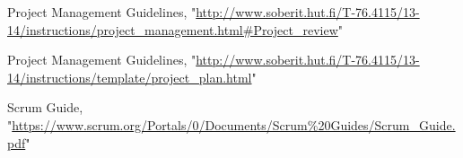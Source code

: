 \documentclass{report}
\begin{document}
 
\begin{thebibliography}{9}

	Project Management Guidelines, "\url{http://www.soberit.hut.fi/T-76.4115/13-14/instructions/project_management.html#Project_review}"
	
		Project Management Guidelines, "\url{http://www.soberit.hut.fi/T-76.4115/13-14/instructions/template/project_plan.html}"

Scrum Guide, "\url{https://www.scrum.org/Portals/0/Documents/Scrum%20Guides/Scrum_Guide.pdf}"

\end{thebibliography}
\end{document}
